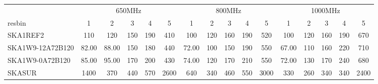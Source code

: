 \begin{table}[!htp]
{{\begin{tabular}{|lccccc||ccccc||ccccc|}
 \tabularnewline \cline{2-16} \multicolumn{1}{c}{ } & \multicolumn{5}{|c}{650MHz}  & \multicolumn{5}{c}{800MHz}  & \multicolumn{5}{c|}{1000MHz} \tabularnewline \cline{1-16} 
 resbin  &1 & 2 & 3 & 4 & 5 & 1 & 2 & 3 & 4 & 5 & 1 & 2 & 3 & 4 & 5 \tabularnewline \hline
SKA1REF2 & 110 \cellcolor{blue!18.89} & 120 \cellcolor{red!22.77} & 150 \cellcolor{green!18.00} & 190 \cellcolor{orange!19.08} & 410 \cellcolor{purple!18.00} & 100 \cellcolor{blue!20.07} & 120 \cellcolor{red!21.50} & 160 \cellcolor{green!19.35} & 190 \cellcolor{orange!18.00} & 520 \cellcolor{purple!18.00} & 100 \cellcolor{blue!23.27} & 120 \cellcolor{red!20.80} & 160 \cellcolor{green!18.00} & 190 \cellcolor{orange!18.00} & 670 \cellcolor{purple!18.00}\\ \hline 
SKA1W9-12A72B120 & 82.00 \cellcolor{blue!18.00} & 88.00 \cellcolor{red!18.00} & 150 \cellcolor{green!18.00} & 180 \cellcolor{orange!18.00} & 440 \cellcolor{purple!18.58} & 72.00 \cellcolor{blue!18.00} & 100 \cellcolor{red!18.00} & 150 \cellcolor{green!18.00} & 190 \cellcolor{orange!18.00} & 550 \cellcolor{purple!18.51} & 67.00 \cellcolor{blue!18.00} & 110 \cellcolor{red!18.00} & 160 \cellcolor{green!18.00} & 220 \cellcolor{orange!26.40} & 710 \cellcolor{purple!18.97}\\ \hline 
SKA1W9-0A72B120 & 85.00 \cellcolor{blue!18.10} & 95.00 \cellcolor{red!19.04} & 170 \cellcolor{green!20.90} & 200 \cellcolor{orange!20.15} & 430 \cellcolor{purple!18.38} & 74.00 \cellcolor{blue!18.15} & 120 \cellcolor{red!21.50} & 170 \cellcolor{green!20.71} & 210 \cellcolor{orange!20.33} & 550 \cellcolor{purple!18.51} & 72.00 \cellcolor{blue!18.80} & 130 \cellcolor{red!23.60} & 170 \cellcolor{green!20.33} & 240 \cellcolor{orange!32.00} & 680 \cellcolor{purple!18.24}\\ \hline 
SKASUR & 1400 \cellcolor{blue!60.00} & 370 \cellcolor{red!60.00} & 440 \cellcolor{green!60.00} & 570 \cellcolor{orange!60.00} & 2600 \cellcolor{purple!60.00} & 640 \cellcolor{blue!60.00} & 340 \cellcolor{red!60.00} & 460 \cellcolor{green!60.00} & 550 \cellcolor{orange!60.00} & 3000 \cellcolor{purple!60.00} & 330 \cellcolor{blue!60.00} & 260 \cellcolor{red!60.00} & 340 \cellcolor{green!60.00} & 340 \cellcolor{orange!60.00} & 2400 \cellcolor{purple!60.00}\tabularnewline \hline 
\end{tabular}}\hfil 
{}}
\end{table}
